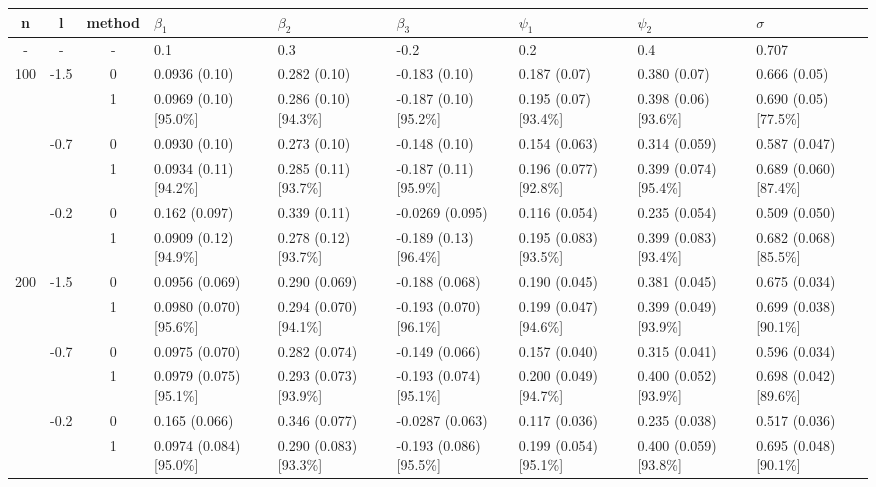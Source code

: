 \documentclass[a4paper,12pt]{article}
\begin{document}
\begin{landscape}
\begin{table}\tiny
\centering
\begin{tabular}{cccllllll}
\hline
\hline
n & l & method & $\beta_1$ & $\beta_2$ & $\beta_3$ & $\psi_1$ & $\psi_2$ & $\sigma$ \\
\hline
- & - &  -     & 0.1 & 0.3 & -0.2 & 0.2 & 0.4 & 0.707 \\

\hline
\multirow{6}{*}{100} & 
\multirow{2}{*}{-1.5} 
			& 0  & 0.0936 (0.10)   & 0.282 (0.10)   &-0.183 (0.10)   & 0.187 (0.07) &0.380 (0.07)  &0.666 (0.05) \\
			&                       & 1  & 0.0969 (0.10) [95.0\%]  & 0.286 (0.10) [94.3\%]  &-0.187 (0.10) [95.2\%]   & 0.195 (0.07) [93.4\%]  &0.398 (0.06) [93.6\%] &0.690 (0.05) [77.5\%] \\
& \multirow{2}{*}{-0.7}   & 0  & 0.0930 (0.10)  & 0.273 (0.10)  &-0.148 (0.10)  & 0.154 (0.063)  &0.314 (0.059)  &0.587 (0.047)\\
&                       & 1  & 0.0934 (0.11) [94.2\%]  & 0.285 (0.11) [93.7\%]  &-0.187 (0.11) [95.9\%]   & 0.196 (0.077)  [92.8\%]  &0.399 (0.074) [95.4\%]  &0.689 (0.060) [87.4\%] \\
& \multirow{2}{*}{-0.2} & 0  & 0.162 (0.097)  & 0.339 (0.11)  &-0.0269 (0.095)  & 0.116 (0.054) &0.235 (0.054)  &0.509 (0.050)\\
&                       & 1  & 0.0909 (0.12) [94.9\%] & 0.278 (0.12)  [93.7\%] &-0.189 (0.13) [96.4\%]  & 0.195 (0.083) [93.5\%] &0.399 (0.083) [93.4\%]  &0.682 (0.068) [85.5\%] \\


\hline
\multirow{6}{*}{200} & 
\multirow{2}{*}{-1.5}   & 0  & 0.0956 (0.069)   &0.290 (0.069)  &-0.188 (0.068)  &0.190 (0.045)  &0.381 (0.045)  &0.675 (0.034)\\
&                       & 1  & 0.0980 (0.070) [95.6\%]  &0.294 (0.070) [94.1\%] &-0.193 (0.070) [96.1\%]  &0.199 (0.047) [94.6\%]  &0.399 (0.049) [93.9\%]   &0.699 (0.038) [90.1\%] \\
& \multirow{2}{*}{-0.7}   & 0& 0.0975 (0.070)	&0.282 (0.074) & -0.149 (0.066) & 0.157 (0.040) &0.315 (0.041) & 0.596 (0.034)\\
&                       & 1  &  0.0979 (0.075) [95.1\%]   &0.293 (0.073) [93.9\%]  &-0.193 (0.074) [95.1\%]  &0.200 (0.049) [94.7\%] &0.400 (0.052) [93.9\%]  &0.698 (0.042) [89.6\%]\\
& \multirow{2}{*}{-0.2} & 0  & 0.165  (0.066) &0.346 (0.077)   &-0.0287 (0.063) &0.117 (0.036) &0.235 (0.038)  &0.517 (0.036) \\
&                       & 1  & 0.0974 (0.084) [95.0\%]  &0.290 (0.083) [93.3\%]  &-0.193 (0.086) [95.5\%]  &0.199 (0.054) [95.1\%] &0.400 (0.059)[93.8\%]  &0.695 (0.048)  [90.1\%] \\


\end{tabular}
\end{table}
\end{landscape}
\end{document}
